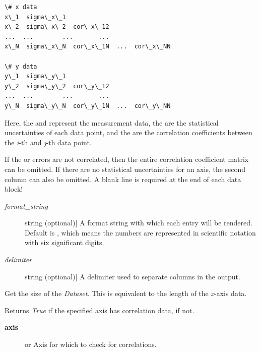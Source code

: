 \documentclass[a4paper,10pt,english]{sphinxmanual}
\begin{document}
\begin{fulllineitems}
\begin{fulllineitems}
\begin{Verbatim}[commandchars=\\\{\}]
\# x data
x\_1  sigma\_x\_1
x\_2  sigma\_x\_2  cor\_x\_12
...  ...        ...       ...
x\_N  sigma\_x\_N  cor\_x\_1N  ...  cor\_x\_NN

\# y data
y\_1  sigma\_y\_1
y\_2  sigma\_y\_2  cor\_y\_12
...  ...        ...       ...
y\_N  sigma\_y\_N  cor\_y\_1N  ...  cor\_y\_NN
\end{Verbatim}

Here, the  and  represent the measurement data, the
 are the statistical uncertainties of each data point, and
the  are the correlation coefficients between the \emph{i}-th
and \emph{j}-th data point.

If the  or  errors are not correlated, then the entire
correlation coefficient matrix can be omitted. If there are no
statistical uncertainties for an axis, the second column can also be
omitted. A blank line is required at the end of each data block!
\begin{description}
\item[{\emph{format\_string}}] \leavevmode{[}string (optional){]}
A format string with which each entry will be rendered. Default is
, which means the numbers are represented in scientific
notation with six significant digits.

\item[{\emph{delimiter}}] \leavevmode{[}string (optional){]}
A delimiter used to separate columns in the output.

\end{description}

\end{fulllineitems}


\begin{fulllineitems}
\label{index:kafe.dataset.Dataset.get_size}
Get the size of the \emph{Dataset}. This is equivalent to the length of the
\emph{x}-axis data.

\end{fulllineitems}


\begin{fulllineitems}
\label{index:kafe.dataset.Dataset.has_correlations}
Returns \emph{True} if the specified axis has correlation data,  if
not.
\begin{description}
\item[{\textbf{axis}}] \leavevmode{[} or \code{'y'}{]}
Axis for which to check for correlations.


\end{description}
\end{fulllineitems}
\end{fulllineitems}
\end{document}
